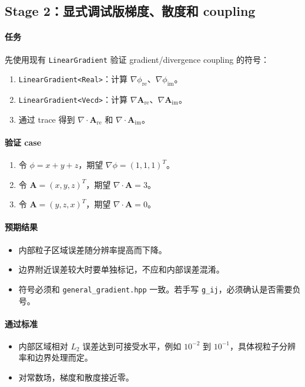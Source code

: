 \documentclass[UTF8,a4paper,11pt]{ctexart}
\newcommand{\code}[1]{\texttt{#1}}
\newcommand{\Are}{\bm A_{\mathrm{re}}}
\newcommand{\Aim}{\bm A_{\mathrm{im}}}
\newcommand{\phire}{\phi_{\mathrm{re}}}
\newcommand{\phiim}{\phi_{\mathrm{im}}}
\begin{document}
\subsection{Stage 2：显式调试版梯度、散度和 coupling}

\paragraph{任务}
先使用现有 \code{LinearGradient} 验证 gradient/divergence coupling 的符号：
\begin{enumerate}
  \item \code{LinearGradient<Real>}：计算 $\nabla\phire$、$\nabla\phiim$。
  \item \code{LinearGradient<Vecd>}：计算 $\nabla\Are$、$\nabla\Aim$。
  \item 通过 trace 得到 $\nabla\cdot\Are$ 和 $\nabla\cdot\Aim$。
\end{enumerate}

\paragraph{验证 case}
\begin{enumerate}
  \item 令 $\phi=x+y+z$，期望 $\nabla\phi=(1,1,1)^T$。
  \item 令 $\bm A=(x,y,z)^T$，期望 $\nabla\cdot\bm A=3$。
  \item 令 $\bm A=(y,z,x)^T$，期望 $\nabla\cdot\bm A=0$。
\end{enumerate}

\paragraph{预期结果}
\begin{itemize}
  \item 内部粒子区域误差随分辨率提高而下降。
  \item 边界附近误差较大时要单独标记，不应和内部误差混淆。
  \item 符号必须和 \code{general\_gradient.hpp} 一致。若手写 \code{g\_ij}，必须确认是否需要负号。
\end{itemize}

\paragraph{通过标准}
\begin{itemize}
  \item 内部区域相对 $L_2$ 误差达到可接受水平，例如 $10^{-2}$ 到 $10^{-1}$，具体视粒子分辨率和边界处理而定。
  \item 对常数场，梯度和散度接近零。
\end{itemize}
\end{document}
